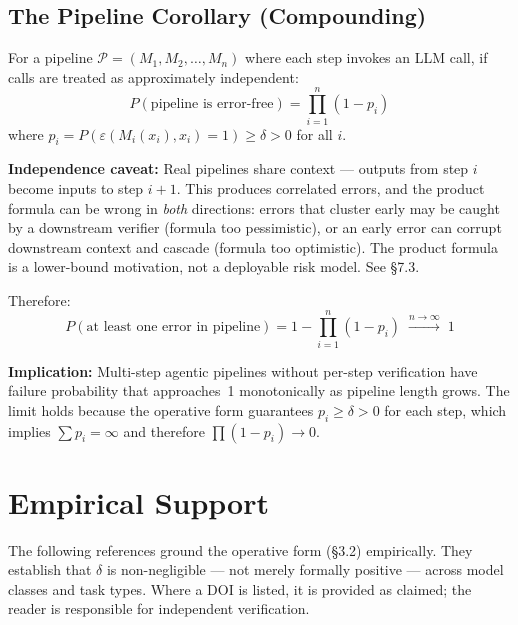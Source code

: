 \documentclass[11pt,a4paper]{article}
\begin{document}
\subsection{The Pipeline Corollary (Compounding)}

For a pipeline $\mathcal{P} = (M_1, M_2, \ldots, M_n)$ where each step invokes an LLM call, if calls are treated as approximately independent:
\begin{equation}
P(\text{pipeline is error-free}) = \prod_{i=1}^{n}(1 - p_i)
\end{equation}
where $p_i = P(\varepsilon(M_i(x_i), x_i) = 1) \geq \delta > 0$ for all $i$.

\begin{notebox}
\textbf{Independence caveat:} Real pipelines share context --- outputs from step $i$ become inputs to step $i+1$. This produces correlated errors, and the product formula can be wrong in \emph{both} directions: errors that cluster early may be caught by a downstream verifier (formula too pessimistic), or an early error can corrupt downstream context and cascade (formula too optimistic). The product formula is a lower-bound motivation, not a deployable risk model. See \S7.3.
\end{notebox}

Therefore:
\begin{equation}
P(\text{at least one error in pipeline}) = 1 - \prod_{i=1}^{n}(1 - p_i)
\;\xrightarrow{n \to \infty}\; 1
\end{equation}

\textbf{Implication:} Multi-step agentic pipelines without per-step verification have failure probability that approaches~1 monotonically as pipeline length grows. The limit holds because the operative form guarantees $p_i \geq \delta > 0$ for each step, which implies $\sum p_i = \infty$ and therefore $\prod(1 - p_i) \to 0$.

\section{Empirical Support}

The following references ground the operative form (\S3.2) empirically. They establish that $\delta$ is non-negligible --- not merely formally positive --- across model classes and task types. Where a DOI is listed, it is provided as claimed; the reader is responsible for independent verification.
\end{document}
